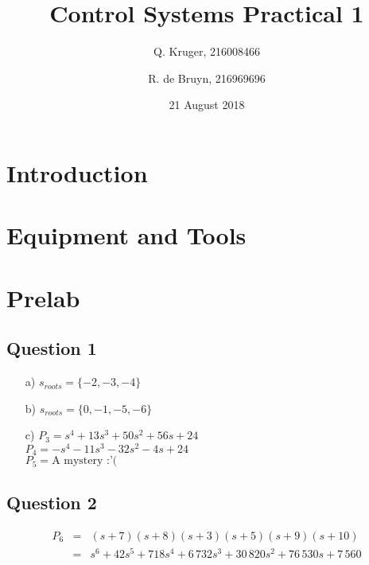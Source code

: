 \documentclass[12pt, a4paper]{article}
\title{Control Systems Practical 1}
\date{21 August 2018}
\author{Q. Kruger, 216008466 \and R. de Bruyn, 216969696}
\begin{document}
	\maketitle
	\newpage
	\tableofcontents
	\newpage
	
	\section{Introduction} %
	\label{sec:introduction}
		

	\section{Equipment and Tools} %
	\label{sec:equipment_and_tools}
		

	\section{Prelab} %
	\label{sec:prelab}
		\subsection*{Question 1} %
		\label{sub:question_1}
			\begin{itemize}
				\item[a)] $s_{roots} = \{-2,-3,-4\}$
				\item[b)] $s_{roots} = \{0,-1,-5,-6\}$
				\item[c)] $P_3 = s^4 + 13s^3 + 50s^2 + 56s + 24$\\
						  $P_4 = -s^4 -11s^3 -32s^2 -4s + 24$ \\
						  $P_5 = \text{A mystery :'(}$
			\end{itemize}

		\subsection*{Question 2} %
		\label{sub:question_2}
			\begin{equation}
				\begin{array}{rcl}
					P_6 & = & (s+7)(s+8)(s+3)(s+5)(s+9)(s+10) \\
					& = & s^6 + 42s^5 +718s^4 + 6\,732s^3 + 30\,820s^2 + 76\,530s + 7\,560
				\end{array}
			\end{equation}
\end{document}
